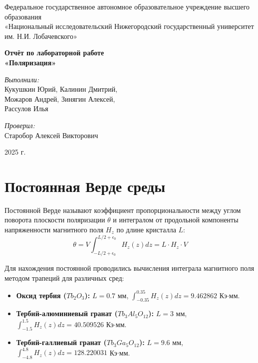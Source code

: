 \documentclass[a4paper,12pt]{article}
\begin{document}
\begin{titlepage}
    \centering
    Федеральное государственное автономное образовательное учреждение высшего образования \\
    «Национальный исследовательский Нижегородский государственный университет им. Н.И. Лобачевского» \par
    \vspace{4cm}
    \Large \textbf{Отчёт по лабораторной работе} \\
    \Huge \textbf{«Поляризация»} \par
    \vspace{3cm}
    \large
    \textit{Выполнили:} \\
    Кукушкин Юрий, Калинин Дмитрий, \\
    Можаров Андрей, Зинягин Алексей, \\
    Рассулов Илья \par \vspace{1em}
    \textit{Проверил:} \\
    Старобор Алексей Викторович \par
    \vfill
    2025 г.
\end{titlepage}

\section{Постоянная Верде среды}

Постоянной Верде называют коэффициент пропорциональности между углом поворота плоскости поляризации $\theta$ и интегралом от продольной компоненты напряженности магнитного поля $H_z$ по длине кристалла $L$:
\begin{equation}
\theta = V \int_{-L/2+\epsilon_0}^{L/2+\epsilon_0} H_z(z) dz = L \cdot H_z \cdot V
\end{equation}

Для нахождения постоянной проводились вычисления интеграла магнитного поля методом трапеций для различных сред:

\begin{itemize}
    \item \textbf{Оксид тербия ($Tb_2O_3$):} $L = 0.7$ мм, $\int_{-0.35}^{0.35} H_z(z) dz = 9.462862$ Кэ$\cdot$мм.
    \item \textbf{Тербий-алюминиевый гранат ($Tb_3Al_5O_{12}$):} $L = 3$ мм, $\int_{-1.5}^{1.5} H_z(z) dz = 40.509526$ Кэ$\cdot$мм.
    \item \textbf{Тербий-галлиевый гранат ($Tb_3Ga_5O_{12}$):} $L = 9.6$ мм, $\int_{-4.8}^{4.8} H_z(z) dz = 128.220031$ Кэ$\cdot$мм.
\end{itemize}
\end{document}
